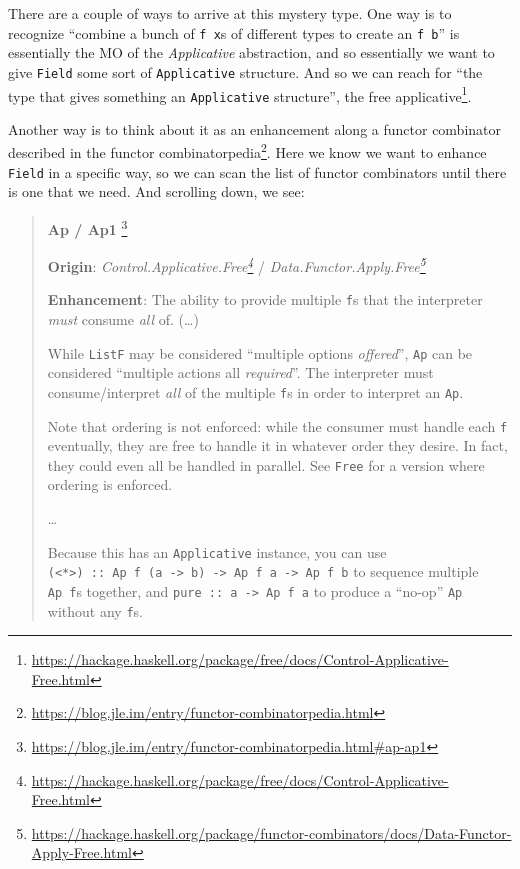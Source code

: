 \documentclass[]{article}
\renewcommand{\href}[2]{#2\footnote{\url{#1}}}
\begin{document}
There are a couple of ways to arrive at this mystery type. One way is to
recognize ``combine a bunch of \texttt{f\ x}s of different types to create an
\texttt{f\ b}'' is essentially the MO of the \emph{Applicative} abstraction, and
so essentially we want to give \texttt{Field} some sort of \texttt{Applicative}
structure. And so we can reach for ``the type that gives something an
\texttt{Applicative} structure'', the
\href{https://hackage.haskell.org/package/free/docs/Control-Applicative-Free.html}{free
applicative}.

Another way is to think about it as an enhancement along a functor combinator
described in the
\href{https://blog.jle.im/entry/functor-combinatorpedia.html}{functor
combinatorpedia}. Here we know we want to enhance \texttt{Field} in a specific
way, so we can scan the list of functor combinators until there is one that we
need. And scrolling down, we see:

\begin{quote}
\href{https://blog.jle.im/entry/functor-combinatorpedia.html\#ap-ap1}{\textbf{Ap
/ Ap1 }}

\textbf{Origin}:
\emph{\href{https://hackage.haskell.org/package/free/docs/Control-Applicative-Free.html}{Control.Applicative.Free}}
/
\emph{\href{https://hackage.haskell.org/package/functor-combinators/docs/Data-Functor-Apply-Free.html}{Data.Functor.Apply.Free}}

\textbf{Enhancement}: The ability to provide multiple \texttt{f}s that the
interpreter \emph{must} consume \emph{all} of. (\ldots)

While \texttt{ListF} may be considered ``multiple options \emph{offered}'',
\texttt{Ap} can be considered ``multiple actions all \emph{required}''. The
interpreter must consume/interpret \emph{all} of the multiple \texttt{f}s in
order to interpret an \texttt{Ap}.

Note that ordering is not enforced: while the consumer must handle each
\texttt{f} eventually, they are free to handle it in whatever order they desire.
In fact, they could even all be handled in parallel. See \texttt{Free} for a
version where ordering is enforced.

\ldots{}

Because this has an \texttt{Applicative} instance, you can use
\texttt{(\textless{}*\textgreater{})\ ::\ Ap\ f\ (a\ -\textgreater{}\ b)\ -\textgreater{}\ Ap\ f\ a\ -\textgreater{}\ Ap\ f\ b}
to sequence multiple \texttt{Ap\ f}s together, and
\texttt{pure\ ::\ a\ -\textgreater{}\ Ap\ f\ a} to produce a ``no-op''
\texttt{Ap} without any \texttt{f}s.
\end{quote}
\end{document}

